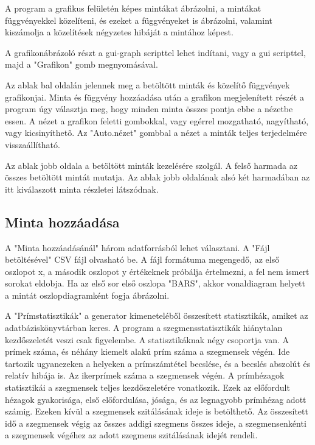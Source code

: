 \documentclass[12pt]{report}
\begin{document}
A program a grafikus felületén képes mintákat ábrázolni, a mintákat függvényekkel
közelíteni, és ezeket a függvényeket is ábrázolni, valamint kiszámolja a közelítések
négyzetes hibáját a mintához képest.

A grafikonábrázoló részt a gui-graph scripttel lehet indítani,
vagy a gui scripttel, majd a "Grafikon" gomb megnyomásával.

Az ablak bal oldalán jelennek meg a betöltött minták és közelítő függvények
grafikonjai. Minta és függvény hozzáadása után a grafikon megjelenített részét
a program úgy választja meg, hogy minden minta összes pontja ebbe a nézetbe essen.
A nézet a grafikon feletti gombokkal, vagy egérrel mozgatható, nagyítható, vagy
kicsinyíthető.
Az "Auto.nézet" gombbal a nézet a minták teljes terjedelmére visszaállítható.

Az ablak jobb oldala a betöltött minták kezelésére szolgál.
A felső harmada az összes betöltött mintát mutatja.
Az ablak jobb oldalának alsó két harmadában az itt kiválaszott minta részletei
látszódnak.

\subsection{Minta hozzáadása}

A "Minta hozzáadásánál" három adatforrásból lehet választani.
A "Fájl betöltésével" CSV fájl olvasható be. A fájl formátuma megengedő,
az első oszlopot x, a második oszlopot y értékeknek próbálja értelmezni,
a fel nem ismert sorokat eldobja. Ha az első sor első oszlopa "BARS",
akkor vonaldiagram helyett a mintát oszlopdiagramként fogja ábrázolni.

A "Prímstatisztikák" a generator kimeneteléből összesített statisztikák,
amiket az adatbáziskönyvtárban keres.
A program a szegmensstatisztikák hiánytalan kezdőszeletét veszi csak figyelembe.
A statisztikáknak négy csoportja van. A prímek száma, és néhány kiemelt alakú prím száma
a szegmensek végén. Ide tartozik ugyanezeken a helyeken a prímszámtétel
becslése, és a becslés abszolút és relatív hibája is.
Az ikerprímek száma a szegmensek végén.
A prímhézagok statisztikái a szegmensek teljes kezdőszeletére vonatkozik. Ezek
az előfordult hézagok gyakorisága, első előfordulása, jósága, és az legnagyobb
prímhézag adott számig.
Ezeken kívül a szegmensek szitálásának ideje is betölthető. Az összesített
idő a szegmensek végig az összes addigi szegmens összes ideje,
a szegmensenkénti a szegmensek végéhez az adott szegmens szitálásának idejét rendeli.
\end{document}
